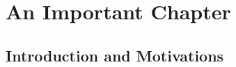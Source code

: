 \documentclass[debug]{phd}
\begin{document}
	\chapter{An Important Chapter}
	\label{chap1}
		
		\section{Introduction and Motivations}
				
\end{document}
